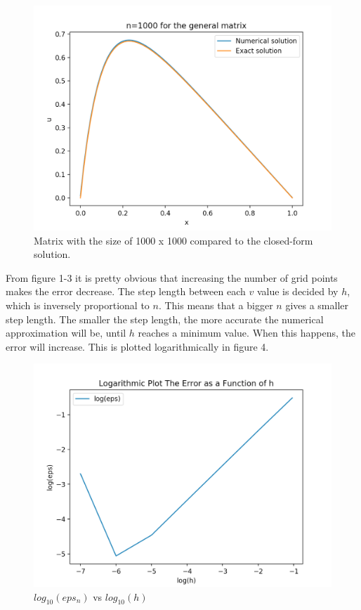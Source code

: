\documentclass[%
oneside,                 %
final,                   %
10pt]{article}
\begin{document}
\begin{figure}[H]
  \includegraphics[scale=0.45]{figur1b_1000.png}
  \caption{Matrix with the size of 1000 x 1000 compared to the closed-form solution.}
  \label{1b_1000}
\end{figure}
\newpage{}

From figure 1-3 it is pretty obvious that increasing the number of grid points makes the error decrease. The step length between each $v$ value is decided by $h$, which is inversely proportional to $n$. This means that a bigger $n$ gives a smaller step length. The smaller the step length, the more accurate the numerical approximation will be, until $h$ reaches a minimum value. When this happens, the error will increase. This is plotted logarithmically in figure 4.

\begin{figure}[H]
  \includegraphics[scale=0.45]{fig-error.png}
  \caption{$log_{10}(eps_n)$ vs $log_{10}(h)$}
  \label{1d}
\end{figure}
\end{document}
